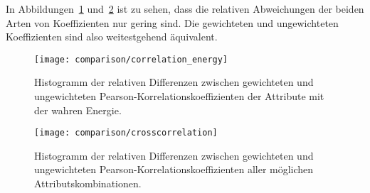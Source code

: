 In Abbildungen~\ref{fig:korrelationen} und~\ref{fig:crosscorrelation} ist zu sehen, dass die relativen Abweichungen der beiden Arten von Koeffizienten nur gering sind.
Die gewichteten und ungewichteten Koeffizienten sind also weitestgehend äquivalent.

\begin{figure}
\begin{center}
    \texttt{[image: comparison/correlation\_energy]}
\end{center}
\vspace{-2em}
\caption{Histogramm der relativen Differenzen zwischen gewichteten und ungewichteten Pearson-Korrelationskoeffizienten der Attribute mit der wahren Energie.}
\label{fig:korrelationen}
\end{figure}
\begin{figure}
\begin{center}
    \texttt{[image: comparison/crosscorrelation]}
\end{center}
\vspace{-2em}
\caption{Histogramm der relativen Differenzen zwischen gewichteten und ungewichteten Pearson-Korrelationskoeffizienten aller möglichen Attributskombinationen.}
\label{fig:crosscorrelation}
\end{figure}




